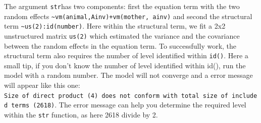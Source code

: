 \documentclass[
  12pt,
]{book}
\begin{document}
The argument \texttt{str}has two components: first the equation term with the two random effects \texttt{\textasciitilde{}vm(animal,Ainv)+vm(mother,\ ainv)} and second the structural term \texttt{\textasciitilde{}us(2):id(number)}. Here within the structural term, we fit a 2x2 unstructured matrix \texttt{us(2)} which estimated the variance and the covariance between the random effects in the equation term.
To successfully work, the structural term also requires the number of level identified within \texttt{id()}. Here a small tip, if you don't know the number of level identified within id(), run the model with a random number. The model will not converge and a error message will appear like this one: \texttt{Size\ of\ direct\ product\ (4)\ does\ not\ conform\ with\ total\ size\ of\ included\ terms\ (2618)}. The error message can help you determine the required level within the \texttt{str} function, as here 2618 divide by 2.
\end{document}
